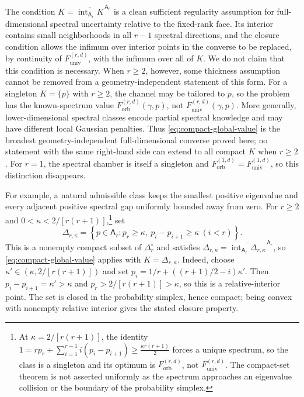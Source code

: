 \documentclass[11pt]{article}
\theoremstyle{remark}
\theoremstyle{plain}
\newcommand{\Forb}{F_{\mathrm{orb}}}
\newcommand{\Funiv}{F_{\mathrm{univ}}}
\begin{document}
The condition
\(K=\overline{\operatorname{int}_{\mathsf A_r}K}^{\,\mathsf A_r}\)
is a clean sufficient regularity assumption for full-dimensional spectral
uncertainty relative to the fixed-rank face.  Its interior contains small
neighborhoods in all \(r-1\)
spectral directions, and the closure condition allows the infimum over
interior points in the converse to be replaced, by continuity of
\(\Funiv^{(r,d)}\),
with the infimum over all of \(K\).  We do not claim that this condition is
necessary.  When \(r\ge2\), however, some thickness assumption cannot be
removed from a geometry-independent statement of this form.  For a
singleton \(K=\{p\}\) with \(r\ge2\),
the channel may be tailored to \(p\), so the problem has the known-spectrum
value \(\Forb^{(r,d)}(\gamma,p)\), not
\(\Funiv^{(r,d)}(\gamma,p)\).  More generally,
lower-dimensional spectral classes encode partial spectral knowledge and
may have different local Gaussian penalties.  Thus
\eqref{eq:compact-global-value} is the broadest geometry-independent
full-dimensional converse proved here; no statement with the same
right-hand side can extend to all compact \(K\) when \(r\ge2\).  For
\(r=1\), the spectral chamber is itself a singleton and
\(\Forb^{(1,d)}=\Funiv^{(1,d)}\), so this distinction disappears.

For example, a natural admissible class keeps the smallest positive
eigenvalue and every adjacent positive spectral gap uniformly bounded away
from zero.  For \(r\ge2\) and
\(0<\kappa<2/[r(r+1)]\),\footnote{At
\(\kappa=2/[r(r+1)]\), the identity
\(
  1=rp_r+\sum_{i=1}^{r-1}i(p_i-p_{i+1})
  \ge\frac{\kappa r(r+1)}2
\)
forces a unique spectrum, so the class is a singleton and its optimum is
\(\Forb^{(r,d)}\), not \(\Funiv^{(r,d)}\).  The compact-set theorem is not asserted uniformly
as the spectrum approaches an eigenvalue collision or the boundary of the
probability simplex.} set
\[
  \Delta_{r,\kappa}
  =\left\{p\in\mathsf A_r:p_r\ge\kappa,\
    p_i-p_{i+1}\ge\kappa\ (i<r)\right\}.
\]
This is a nonempty compact subset of \(\Delta_r^\circ\) and satisfies
\(\Delta_{r,\kappa}
=\overline{\operatorname{int}_{\mathsf A_r}\Delta_{r,\kappa}}
^{\,\mathsf A_r}\),
so \eqref{eq:compact-global-value} applies with
\(K=\Delta_{r,\kappa}\).  Indeed, choose
\(\kappa'\in(\kappa,2/[r(r+1)])\) and set
\(p_i=1/r+((r+1)/2-i)\kappa'\).  Then
\(p_i-p_{i+1}=\kappa'>\kappa\) and
\(p_r>2/[r(r+1)]>\kappa\), so this is a relative-interior point.
The set is closed in the probability simplex, hence compact; being convex
with nonempty relative interior gives the stated closure property.
\end{document}
